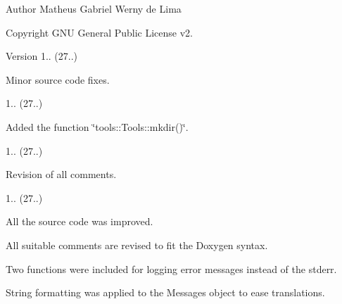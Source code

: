 \begin{DoxyAuthor}{Author}
Matheus Gabriel Werny de Lima 
\end{DoxyAuthor}
\begin{DoxyCopyright}{Copyright}
G\+NU General Public License v2. 
\end{DoxyCopyright}
\begin{DoxyVersion}{Version}
1.. (27..)
\begin{DoxyItemize}
\item Minor source code fixes. 
\end{DoxyItemize}

1.. (27..)
\begin{DoxyItemize}
\item Added the function \char`\"{}tools\+::\+Tools\+::mkdir()\char`\"{}. 
\end{DoxyItemize}

1.. (27..)
\begin{DoxyItemize}
\item Revision of all comments. 
\end{DoxyItemize}

1.. (27..)
\begin{DoxyItemize}
\item All the source code was improved.
\item All suitable comments are revised to fit the Doxygen syntax.
\item Two functions were included for logging error messages instead of the stderr.
\item String formatting was applied to the Messages object to ease translations. 
\end{DoxyItemize}
\end{DoxyVersion}

